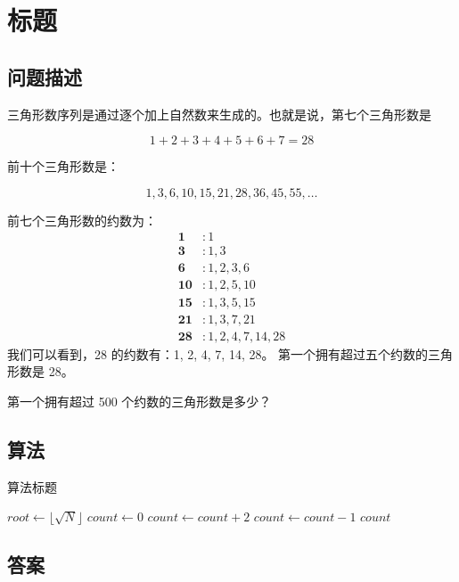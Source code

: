 \section{标题}
\subsection{问题描述}
\begin{tcolorbox}
	三角形数序列是通过逐个加上自然数来生成的。也就是说，第七个三角形数是

	\[
		1 + 2 + 3 + 4 + 5 + 6 + 7 = 28
	\]

	前十个三角形数是：

	\[
		1, 3, 6, 10, 15, 21, 28, 36, 45, 55, \ldots
	\]


	前七个三角形数的约数为：
	\begin{align*}
		\mathbf 1   & \colon 1             \\
		\mathbf 3   & \colon 1,3           \\
		\mathbf 6   & \colon 1,2,3,6       \\
		\mathbf{10} & \colon 1,2,5,10      \\
		\mathbf{15} & \colon 1,3,5,15      \\
		\mathbf{21} & \colon 1,3,7,21      \\
		\mathbf{28} & \colon 1,2,4,7,14,28
	\end{align*}
	我们可以看到，28 的约数有：1, 2, 4, 7, 14, 28。
	第一个拥有超过五个约数的三角形数是 28。

	第一个拥有超过 500 个约数的三角形数是多少？
\end{tcolorbox}

\subsection{算法}
\begin{algorithm}
	\caption{算法标题}
	\begin{algorithmic}[1]
	\State $root \gets \lfloor \sqrt{N} \rfloor$
	\State $ count \gets 0$
	\State $count \gets count + 2$
	\EndFor
	\State $count \gets count - 1$
	\EndIf
	\Return $count$
	\EndFunction
	\end{algorithmic}
\end{algorithm}

\subsection{答案}
